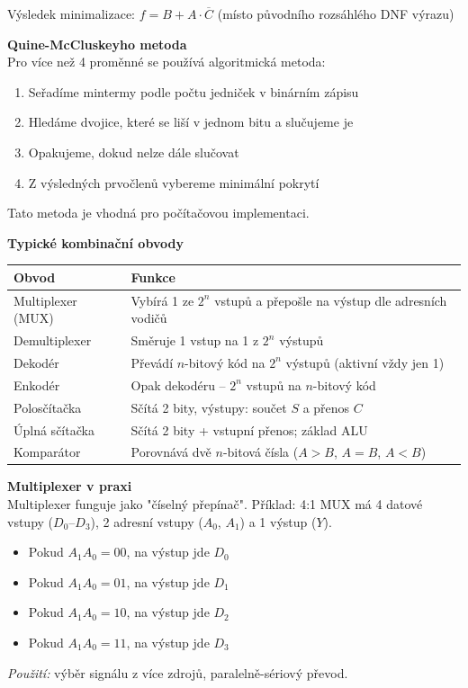 \documentclass[a4paper,10pt]{article}
\begin{document}
\begin{vysvetlenibox}
\begin{vzorcebox}
Výsledek minimalizace: $f = B + A \cdot \overline{C}$
\quad (místo původního rozsáhlého DNF výrazu)
\end{vzorcebox}

\textbf{Quine-McCluskeyho metoda}\\
Pro více než 4 proměnné se používá algoritmická metoda:
\begin{enumerate}[noitemsep, leftmargin=1.4em, topsep=4pt]
    \item Seřadíme mintermy podle počtu jedniček v binárním zápisu
    \item Hledáme dvojice, které se liší v jednom bitu a slučujeme je
    \item Opakujeme, dokud nelze dále slučovat
    \item Z výsledných prvočlenů vybereme minimální pokrytí
\end{enumerate}
Tato metoda je vhodná pro počítačovou implementaci.

\textbf{Typické kombinační obvody}

\begin{center}
\begin{tabularx}{0.95\linewidth}{@{} l X @{}}
    \toprule
    \textbf{Obvod}    & \textbf{Funkce} \\
    \midrule
    Multiplexer (MUX) & Vybírá 1 ze $2^n$ vstupů a přepošle na výstup dle adresních vodičů \\
    Demultiplexer     & Směruje 1 vstup na 1 z $2^n$ výstupů \\
    Dekodér           & Převádí $n$-bitový kód na $2^n$ výstupů (aktivní vždy jen 1) \\
    Enkodér           & Opak dekodéru -- $2^n$ vstupů na $n$-bitový kód \\
    Polosčítačka      & Sčítá 2 bity, výstupy: součet $S$ a přenos $C$ \\
    Úplná sčítačka    & Sčítá 2 bity + vstupní přenos; základ ALU \\
    Komparátor        & Porovnává dvě $n$-bitová čísla ($A>B$, $A=B$, $A<B$) \\
    \bottomrule
\end{tabularx}
\end{center}

\textbf{Multiplexer v praxi}\\
Multiplexer funguje jako "číselný přepínač". Příklad: 4:1 MUX má 4 datové vstupy
($D_0$--$D_3$), 2 adresní vstupy ($A_0$, $A_1$) a 1 výstup ($Y$).
\begin{itemize}[noitemsep, leftmargin=1.4em, topsep=4pt]
    \item Pokud $A_1A_0 = 00$, na výstup jde $D_0$
    \item Pokud $A_1A_0 = 01$, na výstup jde $D_1$
    \item Pokud $A_1A_0 = 10$, na výstup jde $D_2$
    \item Pokud $A_1A_0 = 11$, na výstup jde $D_3$
\end{itemize}
\textit{Použití:} výběr signálu z více zdrojů, paralelně-sériový převod.


\end{vysvetlenibox}
\end{document}
